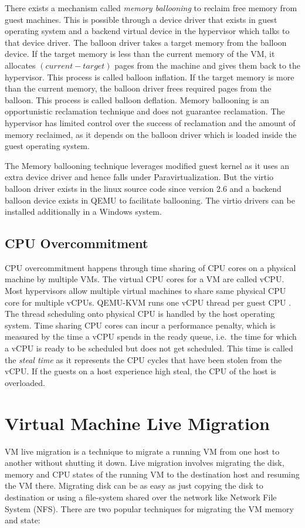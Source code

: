 There exists a mechanism called \textit{memory ballooning} to reclaim free memory from guest machines. This is possible through a device driver that exists in guest operating system and a backend virtual device in the hypervisor which talks to that device driver. The balloon driver takes a target memory from the balloon device. If the target memory is less than the current memory of the VM, it allocates $(current-target)$ pages from the machine and gives them back to the hypervisor. This process is called balloon inflation. If the target memory is more than the current memory, the balloon driver frees required pages from the balloon. This process is called balloon deflation. Memory ballooning is an opportunistic reclamation technique and does not guarantee reclamation. The hypervisor has limited control over the success of reclamation and the amount of memory reclaimed, as it depends on the balloon driver which is loaded inside the guest operating system.

The Memory ballooning technique leverages modified guest kernel as it uses an extra device driver and hence falls under Paravirtualization. But the virtio balloon driver \cite{russell2008virtio} exists in the linux source code since version 2.6 and a backend balloon device exists in QEMU to facilitate ballooning. The virtio drivers can be installed additionally in a Windows system.


\subsection{CPU Overcommitment}
CPU overcommitment happens through time sharing of CPU cores on a physical machine by multiple VMs. The virtual CPU cores for a VM are called vCPU. Most hypervisors allow multiple virtual machines to share same physical CPU core for multiple vCPUs.
QEMU-KVM runs one vCPU thread per guest CPU \cite{qemu-multi}. The thread scheduling onto physical CPU is handled by the host operating system. Time sharing CPU cores can incur a performance penalty, which is measured by the time a vCPU spends in the ready queue, i.e.\, the time for which a vCPU is ready to be scheduled but does not get scheduled. This time is called the \textit{steal time} as it represents the CPU cycles that have been stolen from the vCPU. If the guests on a host experience high steal, the CPU of the host is overloaded.

\section{Virtual Machine Live Migration}
VM live migration \cite{Clark:2005:LMV:1251203.1251223} is a technique to migrate a running VM from one host to another without shutting it down. Live migration involves migrating the disk, memory and CPU states of the running VM to the destination host and resuming the VM there. Migrating disk can be as easy as just copying the disk to destination or using a file-system shared over the network like Network File System (NFS). There are two popular techniques for migrating the VM memory and state:

